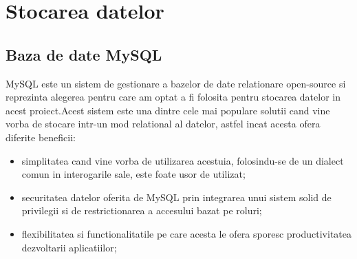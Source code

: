 \section{Stocarea datelor}

 \subsection*{Baza de date MySQL}
	MySQL este un sistem de gestionare a bazelor de date relationare open-source si reprezinta alegerea pentru care am optat a fi folosita pentru stocarea datelor in acest proiect.Acest sistem este una dintre cele mai populare solutii cand vine vorba de stocare intr-un mod relational al datelor, astfel incat acesta ofera diferite beneficii: 
	\begin{itemize}
		
		\item simplitatea cand vine vorba de utilizarea acestuia, folosindu-se de un dialect comun in interogarile sale, este foate usor de utilizat;
		
		\item securitatea datelor oferita de MySQL prin integrarea unui sistem solid de privilegii si de restrictionarea a accesului bazat pe roluri;
		
		\item flexibilitatea si functionalitatile pe care acesta le ofera sporesc productivitatea dezvoltarii aplicatiilor;
	\end{itemize} 
 
